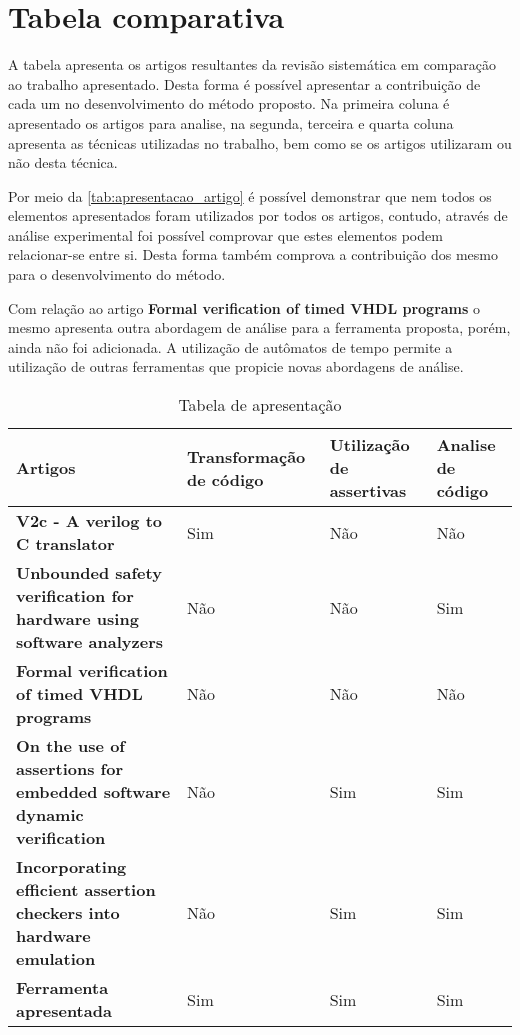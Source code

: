 \section{Tabela comparativa} 
\par 
A tabela apresenta os artigos resultantes da revisão sistemática em comparação ao trabalho apresentado. Desta forma é possível apresentar a contribuição de cada um no desenvolvimento do método proposto. Na primeira coluna é apresentado os artigos para analise, na segunda, terceira e quarta coluna apresenta as técnicas utilizadas no trabalho, bem como se os artigos utilizaram ou não desta técnica. 
\par 
Por meio da \autoref{tab:apresentacao_artigo} é possível demonstrar que nem todos os elementos apresentados foram utilizados por todos os artigos, contudo, através de análise experimental foi possível comprovar que estes elementos podem relacionar-se entre si. Desta forma também comprova a contribuição dos mesmo para o desenvolvimento do método. 
\par 
Com relação ao artigo \textbf{Formal verification of timed VHDL programs} o mesmo apresenta outra abordagem de análise para a ferramenta proposta, porém, ainda não foi adicionada. A utilização de autômatos de tempo permite a utilização de outras ferramentas que propicie novas abordagens de análise. 

\begin{table}[H]
\centering
  \caption{Tabela de apresentação}
  \label{tab:apresentacao_artigo}
\begin{tabular}{|p{}|p{3cm}|p{}|p{2cm}|}
\hline
\textbf{Artigos} & \textbf{Transformação de código} & \textbf{Utilização de assertivas} & \textbf{Analise de código} \\ \hline
\textbf{V2c - A verilog to C translator} & Sim & Não & Não \\ \hline
\textbf{Unbounded safety verification for hardware using software analyzers} & Não & Não & Sim \\ \hline
\textbf{Formal verification of timed VHDL programs} & Não & Não & Não \\ \hline
\textbf{On the use of assertions for embedded software dynamic verification} & Não & Sim & Sim \\ \hline
\textbf{Incorporating efficient assertion checkers into hardware emulation} & Não & Sim & Sim \\ \hline
\textbf{Ferramenta apresentada} & Sim & Sim & Sim \\ \hline
\end{tabular}
\end{table}

